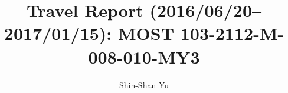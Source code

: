 \newcommand{\Hbbt}{double-\cPqb\,tagger\xspace}
\newcommand{\Sjbt}{subjet \PQb\,tagger\xspace}
\newcommand{\GRS}{\ensuremath{\mathrm{G}_\mathrm{RS}}\xspace}
\newcommand{\mjj}{\ensuremath{m_{\text{jj}}}\xspace}
\newcommand{\Mjj}{\ensuremath{m_{\text{jj}}}\xspace}
\newcommand{\mjjs}{\ensuremath{m_{\text{jj}}^{\text{red}}}\xspace}
\newcommand{\Mjjs}{\ensuremath{m_{\text{jj}}^{\text{red}}}\xspace}
\newcommand{\mjjred}{\ensuremath{m_{\text{jj}}^{\text{red}}}\xspace}
\newcommand{\Mjjred}{\ensuremath{m_{\text{jj}}^{\text{red}}}\xspace}
\newcommand{\mH}{\ensuremath{m_{\text{\PH}}}\xspace}
\newcommand{\mx}{\ensuremath{m_{\text{X}}}\xspace}
\newcommand{\mux}{\ensuremath{\mu_{\text{X}}^{\text{CB}}}\xspace}
\newcommand{\nsub}{\ensuremath{\tau_{21}}\xspace}
\newcommand{\etaj}{\ensuremath{|\eta|}\xspace}
\newcommand{\deta}{\ensuremath{|\Delta\eta_{\text{jj}}|}\xspace}
\newcommand{\mjp}{\ensuremath{m_{\text{jet}}^{\text{pruned}}}\xspace}
\newcommand{\mjsd}{\ensuremath{m_{\text{jet}}^{\text{softdrop,puppi}}}\xspace}
\newcommand{\mj}{\ensuremath{m_{\text{jet}}}\xspace}
\newcommand{\mjone}{\ensuremath{m_{\text{j}_{1}}}\xspace}
\newcommand{\mjtwo}{\ensuremath{m_{\text{j}_{2}}}\xspace}
\newcommand{\LambdaR}{\ensuremath{\Lambda_{\text{R}}}\xspace}
\newcommand{\DeltaEta}{\ensuremath{\Delta\eta(\text{j}_{1}, \text{j}_{2})}\xspace}
\newcommand{\HH}{\PH\PH}
\newcommand{\sgx}{\ensuremath{\sigma_{\text{X}}^{\text{gaus}}}\xspace}
\newcommand{\scbx}{\ensuremath{\sigma_{\text{X}}^{\text{CB}}}\xspace}
\newcommand{\HbbHbb}{\ensuremath{\mathrm{\Hbb\Hbb}}\xspace} 
\newcommand{\XHbbHbb}{\ensuremath{\mathrm{X}\rightarrow\PH\PH\rightarrow\bbbar\bbbar}\xspace}




\title{Travel Report (2016/06/20--2017/01/15): \bf{MOST 103-2112-M-008-010-MY3}}

\address[NCU]{National Central University,  Chung-Li, Taiwan}
\author[NCU]{Shin-Shan Yu}




